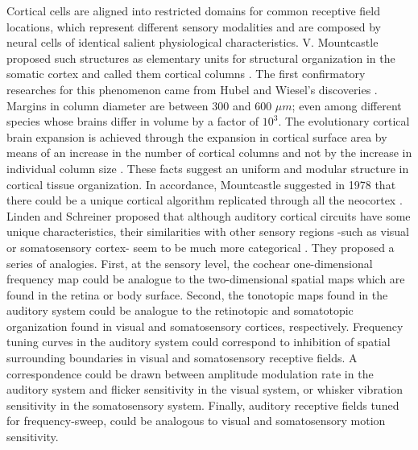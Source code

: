 \documentclass[11pt,a4paper]{article}
\begin{document}
Cortical cells are aligned into restricted domains for common receptive field locations,
which represent different sensory modalities and are composed by neural cells of identical
salient physiological characteristics.
V. Mountcastle proposed such structures as elementary units for structural organization
in the somatic cortex and called them cortical columns \cite{mountcastle_1955, mountcastle_1957}.
The first confirmatory researches for this phenomenon came from Hubel and Wiesel’s
discoveries \cite{hubel_1962, hubel_1968}.
Margins in column diameter are between 300 and 600 $\mu m$; even
among different species whose brains differ in volume by a factor of $10^3$.
The evolutionary cortical brain expansion is achieved through the expansion in
cortical surface area by means of an increase in the number of cortical columns
and not by the increase in individual column size \cite{rakic_1995}.
These facts suggest an uniform and modular structure in cortical tissue organization.
In accordance, Mountcastle suggested in 1978 that there could be
a unique cortical algorithm replicated through all the neocortex
\cite{mountcastle_1978}.\\

Linden and Schreiner proposed that although auditory
cortical circuits have some unique characteristics,
their similarities with other sensory regions -such as visual or somatosensory cortex-
seem to be much more categorical \cite{linden_2003}.
They proposed a series of analogies.
First, at the sensory level, the cochear one-dimensional frequency map
could be analogue to the two-dimensional spatial maps which are found
in the retina or body surface.
Second, the tonotopic maps found in the auditory system could be analogue to the
retinotopic and somatotopic organization found in visual and somatosensory cortices,
respectively.
Frequency tuning curves in the auditory system could correspond to inhibition of
spatial surrounding boundaries in visual and somatosensory receptive fields.
A correspondence could be drawn between amplitude modulation rate
in the auditory system and flicker sensitivity in the visual system, or
whisker vibration sensitivity in the somatosensory system.
Finally, auditory receptive fields tuned for frequency-sweep, could be
analogous to visual and somatosensory motion sensitivity.\\
\end{document}

